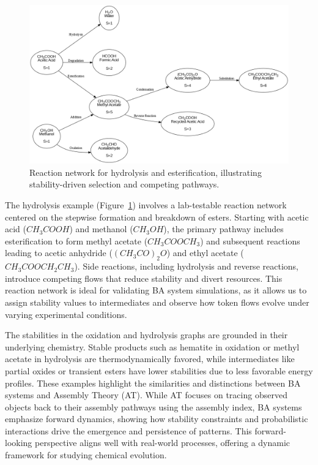 \documentclass[entropy,article,submit,pdftex,moreauthors]{Definitions/mdpi}
\begin{document}
\begin{figure}[h]
    \centering
    \includegraphics[width=1\textwidth]{abc_hydro.png}
    \caption{Reaction network for hydrolysis and esterification, illustrating stability-driven selection and competing pathways.}
    \label{fig:abc_hydro}
\end{figure}

The hydrolysis example (Figure~\ref{fig:abc_hydro}) involves a lab-testable reaction network centered on the stepwise formation and breakdown of esters. Starting with acetic acid (\(CH_3COOH\)) and methanol (\(CH_3OH\)), the primary pathway includes esterification to form methyl acetate (\(CH_3COOCH_3\)) and subsequent reactions leading to acetic anhydride (\((CH_3CO)_2O\)) and ethyl acetate (\(CH_3COOCH_2CH_3\)). Side reactions, including hydrolysis and reverse reactions, introduce competing flows that reduce stability and divert resources. This reaction network is ideal for validating BA system simulations, as it allows us to assign stability values to intermediates and observe how token flows evolve under varying experimental conditions.

The stabilities in the oxidation and hydrolysis graphs are grounded in their underlying chemistry. Stable products such as hematite in oxidation or methyl acetate in hydrolysis are thermodynamically favored, while intermediates like partial oxides or transient esters have lower stabilities due to less favorable energy profiles. These examples highlight the similarities and distinctions between BA systems and Assembly Theory (AT). While AT focuses on tracing observed objects back to their assembly pathways using the assembly index, BA systems emphasize forward dynamics, showing how stability constraints and probabilistic interactions drive the emergence and persistence of patterns. This forward-looking perspective aligns well with real-world processes, offering a dynamic framework for studying chemical evolution.
\end{document}

